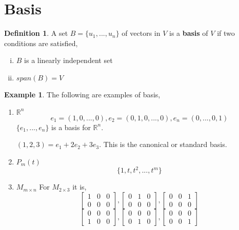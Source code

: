 \documentclass{report}
\theoremstyle{definition}
\newtheorem{_def}{Definition}
\newtheorem{ex}{Example}
\begin{document}
\section{Basis}

\begin{_def}
A set $B=\{u_1,...,u_n\}$ of vectors in $V$ is a \textbf{basis} of $V$ if two conditions are satisfied,
\begin{enumerate}[i)]
 \item $B$ is a linearly independent set
 \item $span(B)=V$
\end{enumerate}
\end{_def}

\begin{ex}
The following are examples of basis,
\begin{enumerate}[1)]
 \item $\mathbb{R}^n$
 \[e_1=(1,0,...,0), e_2=(0,1,0,...,0), e_n=(0,...,0,1)\]
 $\{e_1,...,e_n\}$ is a basis for $\mathbb{R}^n$.

 $(1,2,3)=e_1+2e_2+3e_3$. This is the canonical or standard basis.
 \item $P_m(t)$
 \[\{1,t,t^2,...,t^m\}\]
 \item $M_{m\times n}$
 For $M_{2\times 3}$ it is,
 \[
 \begin{bmatrix}
 1&0&0\\0&0&0
 \end{bmatrix},
 \begin{bmatrix}
 0&1&0\\0&0&0
 \end{bmatrix},
 \begin{bmatrix}
 0&0&1\\0&0&0
 \end{bmatrix}\]
 \[
 \begin{bmatrix}
 0&0&0\\1&0&0
 \end{bmatrix},
 \begin{bmatrix}
 0&0&0\\0&1&0
 \end{bmatrix},
 \begin{bmatrix}
 0&0&0\\0&0&1
 \end{bmatrix}\]
\end{enumerate}
\end{ex}
\end{document}
